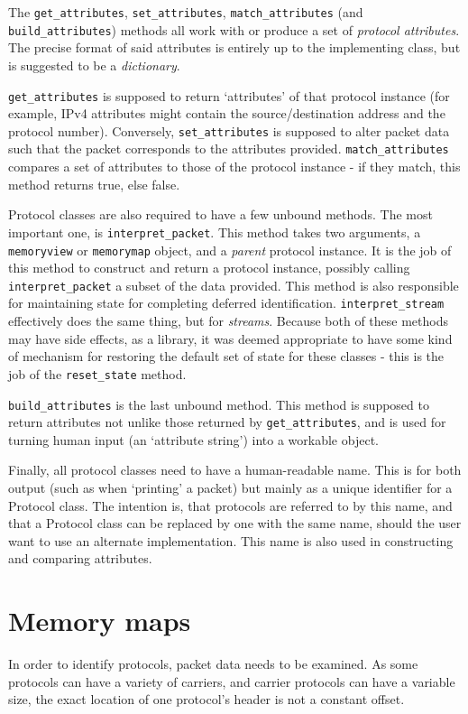 \documentclass[10pt,a4paper,notitlepage]{report}
\begin{document}
The \texttt{get_attributes}, \texttt{set_attributes}, \texttt{match_attributes} (and \texttt{build_attributes})  methods all work with or produce  a set of \emph{protocol attributes}. The precise format of said attributes is entirely up to the implementing class, but is suggested to be a \emph{dictionary}.

\texttt{get_attributes} is supposed to return `attributes' of that protocol instance (for example, IPv4 attributes might contain the source/destination address and the protocol number). Conversely, \texttt{set_attributes} is supposed to alter packet data such that the packet corresponds to the attributes provided. \texttt{match_attributes} compares a set of attributes to those of the protocol instance - if they match, this method returns true, else false.

Protocol classes are also required to have a few unbound methods. The most important one, is \texttt{interpret_packet}. 
This method takes two arguments, a \texttt{memoryview} or \texttt{memorymap} object, and a \emph{parent} protocol instance. It is the job of this method to construct and return a protocol instance, possibly calling \texttt{interpret_packet} a subset of the data provided. This method is also responsible for maintaining state for completing deferred identification. \texttt{interpret_stream} effectively does the same thing, but for \emph{streams}.
Because both of these methods may have side effects, as a library, it was deemed appropriate to have some kind of mechanism for restoring the default set of state for these classes - this is the job of the \texttt{reset_state} method.

\texttt{build_attributes} is the last unbound method. This method is supposed to return attributes not unlike those returned by \texttt{get_attributes}, and is used for turning human input (an `attribute string') into a workable object.

Finally, all protocol classes need to have a human-readable name. This is for both output (such as when `printing' a packet) but mainly as a unique identifier for a Protocol class. The intention is, that protocols are referred to by this name, and that a Protocol class can be replaced by one with the same name, should the user want to use an alternate implementation. This name is also used in constructing and comparing attributes.

\section{Memory maps}
\label{sec:memmap}
In order to identify protocols, packet data needs to be examined. As some protocols can have a variety of carriers, and carrier protocols can have a variable size, the exact location of one protocol's header is not a constant offset.
\end{document}

